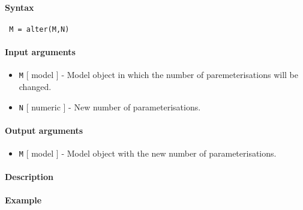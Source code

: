 


	\paragraph{Syntax}
 
 \begin{verbatim}
 M = alter(M,N)
 \end{verbatim}
 
 \paragraph{Input arguments}
 
 \begin{itemize}
 \item
   \texttt{M} {[} model {]} - Model object in which the number of
   paremeterisations will be changed.
 \item
   \texttt{N} {[} numeric {]} - New number of parameterisations.
 \end{itemize}
 
 \paragraph{Output arguments}
 
 \begin{itemize}
 \item
   \texttt{M} {[} model {]} - Model object with the new number of
   parameterisations.
 \end{itemize}
 
 \paragraph{Description}
 
 \paragraph{Example}


